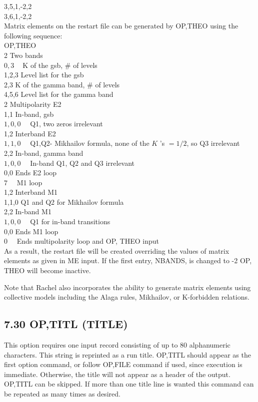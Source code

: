 \documentclass[10pt]{article}
\begin{document}
3,5,1,-2,2\\
3,6,1,-2,2\\
Matrix elements on the restart file can be generated by OP,THEO using the following sequence:\\
OP,THEO\\
2 Two bands\\
$0,3 \quad \mathrm{~K}$ of the gsb, \# of levels\\
1,2,3 Level list for the gsb\\
2,3 K of the gamma band, \# of levels\\
4,5,6 Level list for the gamma band\\
2 Multipolarity E2\\
1,1 In-band, gsb\\
$1,0,0 \quad$ Q1, two zeros irrelevant\\
1,2 Interband E2\\
$1,1,0 \quad$ Q1,Q2- Mikhailov formula, none of the $K$ 's $=1 / 2$, so Q3 irrelevant\\
2,2 In-band, gamma band\\
$1,0,0 \quad$ In-band Q1, Q2 and Q3 irrelevant\\
0,0 Ends E2 loop\\
$7 \quad$ M1 loop\\
1,2 Interband M1\\
1,1,0 Q1 and Q2 for Mikhailov formula\\
2,2 In-band M1\\
$1,0,0 \quad$ Q1 for in-band transitions\\
0,0 Ends M1 loop\\
$0 \quad$ Ends multipolarity loop and OP, THEO input\\
As a result, the restart file will be created overriding the values of matrix elements as given in ME input. If the first entry, NBANDS, is changed to -2 OP, THEO will become inactive.

Note that Rachel also incorporates the ability to generate matrix elements using collective models including the Alaga rules, Mikhailov, or K-forbidden relations.

\subsection*{7.30 OP,TITL (TITLE)}
This option requires one input record consisting of up to 80 alphanumeric characters. This string is reprinted as a run title. OP,TITL should appear as the first option command, or follow OP,FILE command if used, since execution is immediate. Otherwise, the title will not appear as a header of the output. OP,TITL can be skipped. If more than one title line is wanted this command can be repeated as many times as desired.
\end{document}
